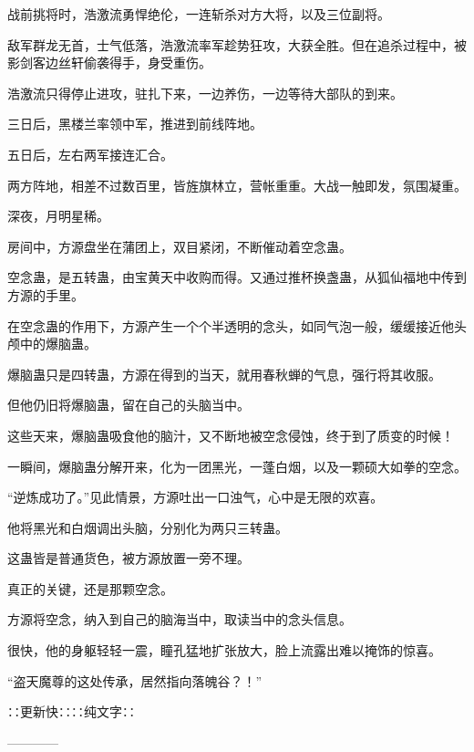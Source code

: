 \begin{this_body}
战前挑将时，浩激流勇悍绝伦，一连斩杀对方大将，以及三位副将。

敌军群龙无首，士气低落，浩激流率军趁势狂攻，大获全胜。但在追杀过程中，被影剑客边丝轩偷袭得手，身受重伤。

浩激流只得停止进攻，驻扎下来，一边养伤，一边等待大部队的到来。

三日后，黑楼兰率领中军，推进到前线阵地。

五日后，左右两军接连汇合。

两方阵地，相差不过数百里，皆旌旗林立，营帐重重。大战一触即发，氛围凝重。

深夜，月明星稀。

房间中，方源盘坐在蒲团上，双目紧闭，不断催动着空念蛊。

空念蛊，是五转蛊，由宝黄天中收购而得。又通过推杯换盏蛊，从狐仙福地中传到方源的手里。

在空念蛊的作用下，方源产生一个个半透明的念头，如同气泡一般，缓缓接近他头颅中的爆脑蛊。

爆脑蛊只是四转蛊，方源在得到的当天，就用春秋蝉的气息，强行将其收服。

但他仍旧将爆脑蛊，留在自己的头脑当中。

这些天来，爆脑蛊吸食他的脑汁，又不断地被空念侵蚀，终于到了质变的时候！

一瞬间，爆脑蛊分解开来，化为一团黑光，一蓬白烟，以及一颗硕大如拳的空念。

“逆炼成功了。”见此情景，方源吐出一口浊气，心中是无限的欢喜。

他将黑光和白烟调出头脑，分别化为两只三转蛊。

这蛊皆是普通货色，被方源放置一旁不理。

真正的关键，还是那颗空念。

方源将空念，纳入到自己的脑海当中，取读当中的念头信息。

很快，他的身躯轻轻一震，瞳孔猛地扩张放大，脸上流露出难以掩饰的惊喜。

“盗天魔尊的这处传承，居然指向落魄谷？！”

∷更新快∷∷纯文字∷

------------

\end{this_body}

